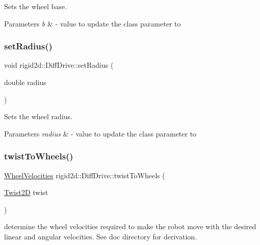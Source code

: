 Sets the wheel base. 


\begin{DoxyParams}{Parameters}
{\em b} & -\/ value to update the class parameter to \\
\hline
\end{DoxyParams}
\mbox{\label{classrigid2d_1_1DiffDrive_adc465e5cf9027ffb207a3775800d2033}} 
\subsubsection{\texorpdfstring{set\+Radius()}{setRadius()}}
{\footnotesize\ttfamily void rigid2d\+::\+Diff\+Drive\+::set\+Radius (\begin{DoxyParamCaption}\item[{double}]{radius }\end{DoxyParamCaption})}



Sets the wheel radius. 


\begin{DoxyParams}{Parameters}
{\em radius} & -\/ value to update the class parameter to \\
\hline
\end{DoxyParams}
\mbox{\label{classrigid2d_1_1DiffDrive_a636194ac11bb3851059989ae118bbf1d}} 
\subsubsection{\texorpdfstring{twist\+To\+Wheels()}{twistToWheels()}}
{\footnotesize\ttfamily \hyperlink{structrigid2d_1_1WheelVelocities}{Wheel\+Velocities} rigid2d\+::\+Diff\+Drive\+::twist\+To\+Wheels (\begin{DoxyParamCaption}\item[{\hyperlink{structrigid2d_1_1Twist2D}{Twist2D}}]{twist }\end{DoxyParamCaption})}



determine the wheel velocities required to make the robot move with the desired linear and angular velocities. See doc directory for derivation. 


